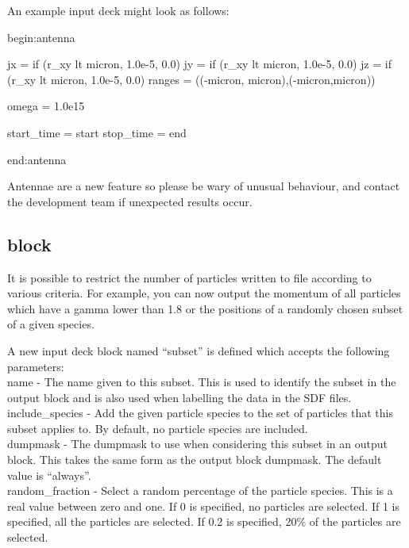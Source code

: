 An example input deck might look as follows:\\

\begin{boxverbatim}
begin:antenna

  jx = if (r_xy lt micron, 1.0e-5, 0.0)
  jy = if (r_xy lt micron, 1.0e-5, 0.0)
  jz = if (r_xy lt micron, 1.0e-5, 0.0)
  ranges = ((-micron, micron),(-micron,micron))

  omega = 1.0e15

  start_time = start
  stop_time = end

end:antenna
\end{boxverbatim}

{\emphtext
  Antennae are a new feature so please be wary of unusual behaviour, and
  contact the {\EPOCH} development team if unexpected results occur.}

\subsection{ block}
\label{sec:subset_block}

It is possible to restrict the number of particles written to file
according to various criteria. For example, you can now output the
momentum of all particles which have a gamma lower than 1.8 or the
positions of a randomly chosen subset of a given species.

A new input deck block named ``subset'' is defined which accepts the following
parameters:\\

{\emphtext name} - The name given to this subset. This is used to identify the
  subset in the output block and is also used when labelling the data in the
  SDF files.\\

{\emphtext include\_species} - Add the given particle species to the set of
  particles that this subset applies to. By default, no particle species
  are included.\\

{\emphtext dumpmask} - The dumpmask to use when considering this subset in
  an output block. This takes the same form as the output block dumpmask.
  The default value is ``always''.\\

{\emphtext random\_fraction} - Select a random percentage of the particle
  species. This is a real value between zero and one. If 0 is specified,
  no particles are selected. If 1 is specified, all the particles are
  selected. If 0.2 is specified, 20\% of the particles are selected.\\

